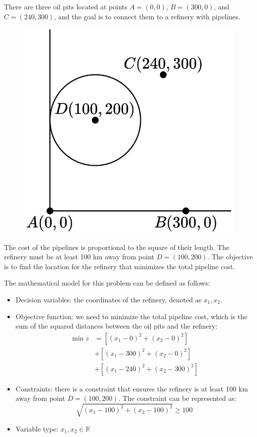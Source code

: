 \begin{example}
    There are three oil pits located at points $A=(0,0)$, $B=(300,0)$, and $C=(240,300)$, and the goal is to connect them to a refinery with pipelines.
    \begin{figure}[H]
        \centering
        \includegraphics[width=0.25\linewidth]{images/example3.png}
    \end{figure}
    The cost of the pipelines is proportional to the square of their length.
    The refinery must be at least 100 km away from point $D=(100,200)$.
    The objective is to find the location for the refinery that minimizes the total pipeline cost.

    The mathematical model for this problem can be defined as follows:
    \begin{itemize}
        \item Decision variables: the coordinates of the refinery, denoted as $x_1,x_2$. 
        \item Objective function: we need to minimize the total pipeline cost, which is the sum of the squared distances between the oil pits and the refinery:
        \begin{align*}
            \min{z} &=\left[ (x_1-0)^2+(x_2-0)^2 \right] \\
                    &+ \left[ (x_1-300)^2+(x_2-0)^2 \right] \\
                    &+ \left[ (x_1-240)^2+(x_2-300)^2 \right] 
        \end{align*}
        \item Constraints: there is a constraint that ensures the refinery is at least 100 km away from point $D=(100,200)$. 
            The constraint can be represented as:
            \[\sqrt{{\left( x_1-100 \right)}^2+{\left( x_2-100 \right)}^2} \geq 100\]
        \item Variable type: $x_1,x_2 \in \mathbb{R}$
    \end{itemize}
\end{example}